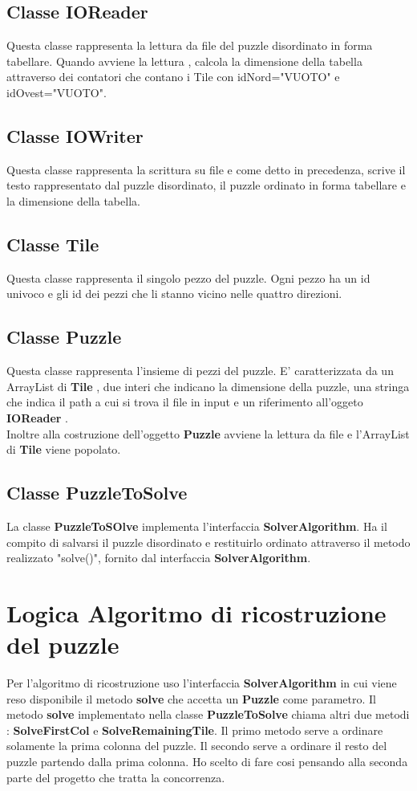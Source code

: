 \documentclass[11pt]{article}
\begin{document}
\subsection{Classe IOReader}
Questa classe rappresenta la lettura da file del puzzle disordinato in forma tabellare. Quando avviene la lettura , calcola la dimensione della tabella attraverso dei contatori che contano i Tile con idNord="VUOTO" e idOvest="VUOTO".
\subsection{Classe IOWriter}
Questa classe rappresenta la scrittura su file e come detto in precedenza, scrive il testo rappresentato dal puzzle disordinato, il puzzle ordinato in forma tabellare e la dimensione della tabella.
\subsection{Classe Tile}
Questa classe rappresenta il singolo pezzo del puzzle. Ogni pezzo ha un id univoco e gli id dei pezzi che li stanno vicino nelle quattro direzioni. 
\subsection{Classe Puzzle}
Questa classe rappresenta l'insieme di pezzi del puzzle. E' caratterizzata da un ArrayList di \textbf{Tile} , due interi che indicano la dimensione della puzzle, una stringa che indica il path a cui si trova il file in input e un riferimento all'oggeto \textbf{IOReader }.\\
Inoltre alla costruzione dell'oggetto \textbf{Puzzle} avviene la lettura da file e l'ArrayList di \textbf{Tile} viene popolato.
\subsection{Classe PuzzleToSolve}
La classe \textbf{PuzzleToSOlve} implementa l'interfaccia \textbf{SolverAlgorithm}. Ha il compito di salvarsi il puzzle disordinato e restituirlo ordinato attraverso il metodo realizzato "solve()", fornito dal interfaccia \textbf{SolverAlgorithm}. 
\section{Logica Algoritmo di ricostruzione del puzzle}
Per l'algoritmo di ricostruzione uso l'interfaccia \textbf{SolverAlgorithm} in cui viene reso disponibile il metodo \textbf{solve} che accetta un \textbf{Puzzle} come parametro. Il metodo \textbf{solve} implementato nella classe \textbf{PuzzleToSolve} chiama altri due metodi : \textbf{SolveFirstCol} e \textbf{SolveRemainingTile}. Il primo metodo serve a ordinare solamente la prima colonna del puzzle. Il secondo serve a ordinare il resto del puzzle partendo dalla prima colonna. Ho scelto di fare cosi pensando alla seconda parte del progetto che tratta la concorrenza.
\end{document}
